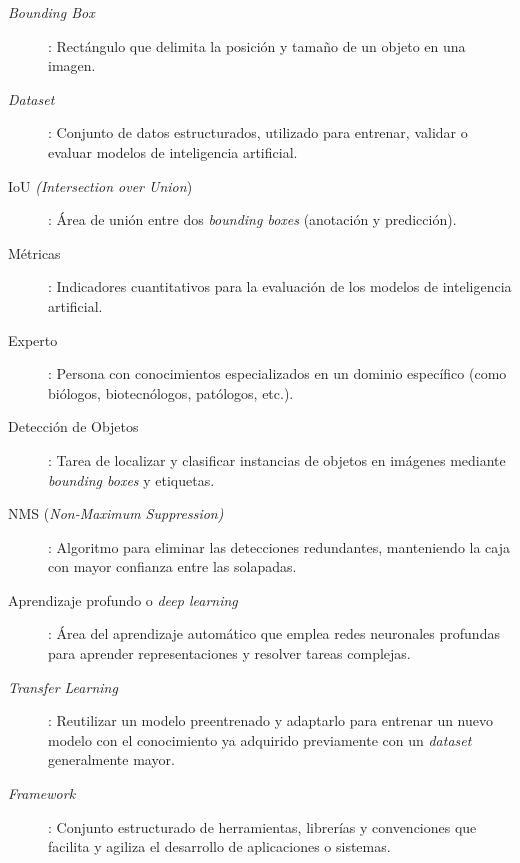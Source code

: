 \documentclass[12pt,a4paper,onecolumn,oneside]{report}
\begin{document}
\begin{description}
  \item[\textit{Bounding Box}]: Rectángulo que delimita la posición y tamaño de un objeto en una imagen.
  \item[\textit{Dataset}]: Conjunto de datos estructurados, utilizado para entrenar, validar o evaluar modelos de inteligencia artificial.
  \item[IoU \textit{(Intersection over Union})]: Área de unión entre dos \textit{bounding boxes} (anotación y predicción).
  \item[Métricas]: Indicadores cuantitativos para la evaluación de los modelos de inteligencia artificial.
  \item[Experto]: Persona con conocimientos especializados en un dominio específico (como biólogos, biotecnólogos, patólogos, etc.).
  \item[Detección de Objetos]: Tarea de localizar y clasificar instancias de objetos en imágenes mediante \textit{bounding boxes} y etiquetas. 
  \item[NMS (\textit{Non-Maximum Suppression)}]: Algoritmo para eliminar las detecciones redundantes, manteniendo la caja con mayor confianza entre las solapadas.
  \item[Aprendizaje profundo o \textit{deep learning}]: Área del aprendizaje automático que emplea redes neuronales profundas para aprender representaciones y resolver tareas complejas.
  \item[\textit{Transfer Learning}]: Reutilizar un modelo preentrenado y adaptarlo para entrenar un nuevo modelo con el conocimiento ya adquirido previamente con un \textit{dataset} generalmente mayor.
  \item[\textit{Framework}]: Conjunto estructurado de herramientas, librerías y convenciones que facilita y agiliza el desarrollo de aplicaciones o sistemas.

\end{description}
\end{document}
